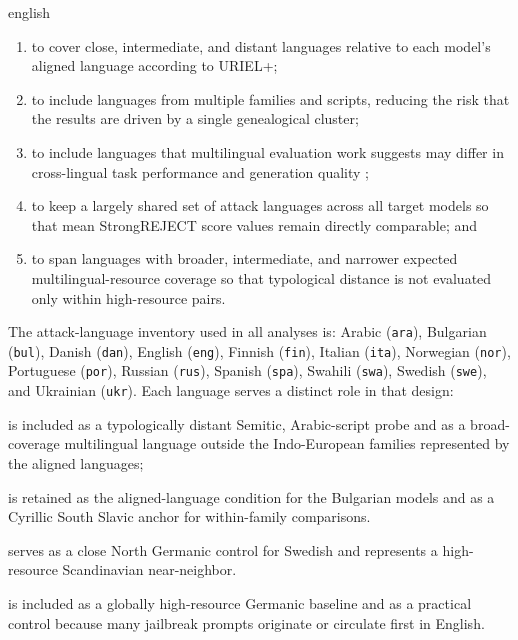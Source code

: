 \begin{otherlanguage*}{english}
\begin{enumerate}
	\item to cover close, intermediate, and distant languages relative to each model's aligned language according to URIEL+;
	\item to include languages from multiple families and scripts, reducing the risk that the results are driven by a single genealogical cluster;
	\item to include languages that multilingual evaluation work suggests may differ in cross-lingual task performance and generation quality \cite{hu2020xtreme,chollampatt2025cross};
	\item to keep a largely shared set of attack languages across all target models so that mean StrongREJECT score values remain directly comparable; and 
	\item to span languages with broader, intermediate, and narrower expected multilingual-resource coverage so that typological distance is not evaluated only within high-resource pairs.
\end{enumerate}

The attack-language inventory used in all analyses is: Arabic (\texttt{ara}), Bulgarian (\texttt{bul}), Danish (\texttt{dan}), English (\texttt{eng}), Finnish (\texttt{fin}), Italian (\texttt{ita}), Norwegian (\texttt{nor}), Portuguese (\texttt{por}), Russian (\texttt{rus}), Spanish (\texttt{spa}), Swahili (\texttt{swa}), Swedish (\texttt{swe}), and Ukrainian (\texttt{ukr}). Each language serves a distinct role in that design:

\begin{description}[style=multiline,leftmargin=2.2cm,labelwidth=1.6cm,font=\normalfont\ttfamily]

\item[ara] is included as a typologically distant Semitic, Arabic-script probe and as a broad-coverage multilingual language outside the Indo-European families represented by the aligned languages;

\item[bul] is retained as the aligned-language condition for the Bulgarian models and as a Cyrillic South Slavic anchor for within-family comparisons.

\item[dan] serves as a close North Germanic control for Swedish and represents a high-resource Scandinavian near-neighbor.

\item[eng] is included as a globally high-resource Germanic baseline and as a practical control because many jailbreak prompts originate or circulate first in English.


\end{description}
\end{otherlanguage*}
